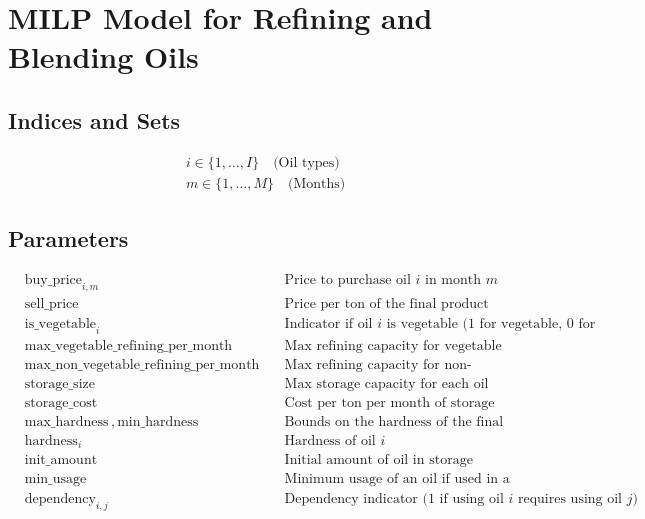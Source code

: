 \documentclass{article}
\begin{document}
\section*{MILP Model for Refining and Blending Oils}

\subsection*{Indices and Sets}
\begin{align*}
    &i \in \{1, \ldots, I\} \quad \text{(Oil types)} \\
    &m \in \{1, \ldots, M\} \quad \text{(Months)}
\end{align*}

\subsection*{Parameters}
\begin{align*}
    &\text{buy\_price}_{i,m} &\quad \text{Price to purchase oil $i$ in month $m$} \\
    &\text{sell\_price} &\quad \text{Price per ton of the final product} \\
    &\text{is\_vegetable}_i &\quad \text{Indicator if oil $i$ is vegetable (1 for vegetable, 0 for non-vegetable)} \\
    &\text{max\_vegetable\_refining\_per\_month} &\quad \text{Max refining capacity for vegetable oils} \\
    &\text{max\_non\_vegetable\_refining\_per\_month} &\quad \text{Max refining capacity for non-vegetable oils} \\
    &\text{storage\_size} &\quad \text{Max storage capacity for each oil} \\
    &\text{storage\_cost} &\quad \text{Cost per ton per month of storage} \\
    &\text{max\_hardness} \,,\, \text{min\_hardness} &\quad \text{Bounds on the hardness of the final product} \\
    &\text{hardness}_i &\quad \text{Hardness of oil $i$} \\
    &\text{init\_amount} &\quad \text{Initial amount of oil in storage} \\
    &\text{min\_usage} &\quad \text{Minimum usage of an oil if used in a month} \\
    &\text{dependency}_{i,j} &\quad \text{Dependency indicator (1 if using oil $i$ requires using oil $j$)} \\
\end{align*}
\end{document}
